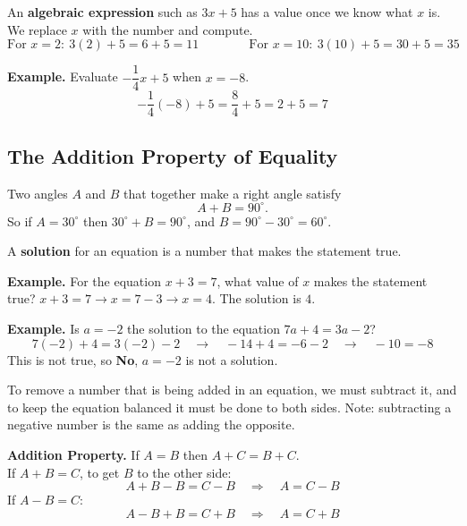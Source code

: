 \documentclass[letter]{article}
\newenvironment{keybox}
  {\begin{lrbox}{\keyboxsave}\begin{minipage}{\dimexpr\linewidth-2\fboxsep-2\fboxrule\relax}}
  {\end{minipage}\end{lrbox}\par\noindent\fbox{\usebox{\keyboxsave}}\par}
\begin{document}
An \textbf{algebraic expression} such as $3x+5$ has a value once we know what $x$ is. We replace $x$ with the number and compute.
\[\text{For }x=2:\ 3(2)+5=6+5=11\qquad\qquad\text{For }x=10:\ 3(10)+5=30+5=35\]

\textbf{Example.} Evaluate $-\dfrac14x+5$ when $x=-8$.
\[-\frac14(-8)+5=\frac84+5=2+5=7\]

\subsection{The Addition Property of Equality}

Two angles $A$ and $B$ that together make a right angle satisfy
\[A+B=90^\circ.\]
So if $A=30^\circ$ then $30^\circ+B=90^\circ$, and $B=90^\circ-30^\circ=60^\circ$.

\begin{center}
\end{center}

\begin{keybox}
A \textbf{solution} for an equation is a number that makes the statement true.
\end{keybox}

\textbf{Example.} For the equation $x+3=7$, what value of $x$ makes the statement true? $x+3=7\to x=7-3\to x=4$. The solution is $4$.

\textbf{Example.} Is $a=-2$ the solution to the equation $7a+4=3a-2$?
\[7(-2)+4=3(-2)-2\quad\to\quad-14+4=-6-2\quad\to\quad-10=-8\]
This is not true, so \textbf{No}, $a=-2$ is not a solution.

To remove a number that is being added in an equation, we must subtract it, and to keep the equation balanced it must be done to both sides. Note: subtracting a negative number is the same as adding the opposite.

\begin{keybox}
\textbf{Addition Property.} If $A=B$ then $A+C=B+C$.\\[4pt]
If $A+B=C$, to get $B$ to the other side:
\[A+B-B=C-B\quad\Rightarrow\quad A=C-B\]
If $A-B=C$:
\[A-B+B=C+B\quad\Rightarrow\quad A=C+B\]
\end{keybox}
\end{document}
